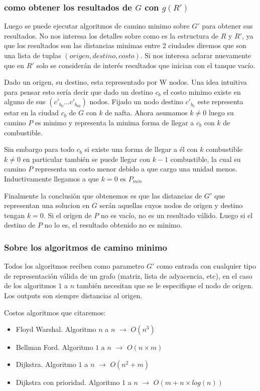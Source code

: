\documentclass[12pt]{article}
\begin{document}
\subsubsection{como obtener los resultados de $G$ con $g(R')$}

Luego se puede ejecutar algoritmos de camino minimo sobre $G'$ para obtener sus resultados. No nos interesa los detalles sobre como es la estructura de $R$ y $R'$, ya que los resultados son las distancias minimas entre 2 ciudades diremos que son una lista de tuplas $(origen, destino, costo)$. Si nos interesa aclarar nuevamente que en $R'$ solo se considerán de interés resultados que inician con el tanque vacío.

Dado un origen, su destino, esta representado por W nodos. Una idea intuitiva para pensar esto sería decir que dado un destino $c_b$ el costo minimo existe en alguno de sus $(c'_{b_0}...c'_{b_{60}})$ nodos. Fijado un nodo destino $c'_{b_k}$ este representa estar en la ciudad $c_b$ de $G$ con $k$ de nafta. Ahora asumamos $k \neq 0$ luego su camino $P$ es minimo y representa la minima forma de llegar a $c_b$ con $k$ de combustible.

Sin embargo para todo $c_b$ si existe una forma de llegar a él con $k$ combustible $k \neq 0$ en particular también se puede llegar con $k-1$ combustible, la cual su camino $P$ representa un costo menor debido a que cargo una unidad menos. Inductivamente llegamos a que $k=0$ es $P_{min}$

Finalmente la conclusión que obtenemos es que las distancias de $G'$ que representan una solucion en $G$ serán aquellas cuyos nodos de origen y destino tengan $k = 0$. Si el origen de $P$ no es vacío, no es un resultado válido. Luego si el destino de $P$ no lo es, el resultado obtenido no es minimo.

\subsubsection{Sobre los algoritmos de camino minimo}

Todos los algoritmos reciben como parametro $G'$ como entrada con cualquier tipo de representación válida de un grafo (matriz, lista de adyacencia, etc), en el caso de los algoritmos $1$ a $n$ también necesitan que se le especifique el nodo de origen. Los outputs son siempre distancias al origen.

Costos algoritmos que citaremos:
\begin{itemize}
	\item Floyd Warshal. Algoritmo $n$ a $n$ $\rightarrow$  $O(n^3)$
	\item Bellman Ford. Algoritmo $1$ a $n$ $\rightarrow$ $O(n \times m)$
	\item Dijkstra. Algoritmo $1$ a $n$ $\rightarrow$ $O(n^2+m)$
	\item Dijkstra con prioridad. Algoritmo $1$ a $n$ $\rightarrow$  $O(m + n \times log (n))$
\end{itemize}
\end{document}
